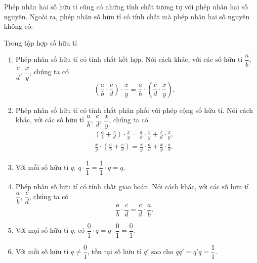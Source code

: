 Phép nhân hai số hữu tỉ cũng có những tính chất tương tự với phép nhân hai số nguyên. Ngoài ra, phép nhân số hữu tỉ có tính chất mà phép nhân hai số nguyên không có.
\begin{theorem}\label{theorem:property-of-rational-numbers-multiplication}
    Trong tập hợp số hữu tỉ
    \begin{enumerate}[label={(\roman*)}]
        \item Phép nhân số hữu tỉ có tính chất kết hợp. Nói cách khác, với các số hữu tỉ $\dfrac{a}{b}$, $\dfrac{c}{d}$, $\dfrac{x}{y}$, chúng ta có
              \[
                  \left(\frac{a}{b}\cdot\frac{c}{d}\right)\cdot\frac{x}{y} = \frac{a}{b}\cdot\left(\frac{c}{d}\cdot\frac{x}{y}\right).
              \]
        \item Phép nhân số hữu tỉ có tính chất phân phối với phép cộng số hữu tỉ. Nói cách khác, với các số hữu tỉ $\dfrac{a}{b}$, $\dfrac{c}{d}$, $\dfrac{x}{y}$, chúng ta có
              \[
                  \begin{split}
                      \left(\frac{a}{b} + \frac{c}{d}\right)\cdot\frac{x}{y} = \frac{a}{b}\cdot\frac{x}{y} + \frac{c}{d}\cdot\frac{x}{y}, \\
                      \frac{x}{y}\cdot\left(\frac{a}{b} + \frac{c}{d}\right) = \frac{x}{y}\cdot\frac{a}{b} + \frac{x}{y}\cdot\frac{a}{b}.
                  \end{split}
              \]
        \item Với mỗi số hữu tỉ $q$, $q\cdot \dfrac{1}{1} = \dfrac{1}{1}\cdot q = q$.
        \item Phép nhân số hữu tỉ có tính chất giao hoán. Nói cách khác, với các số hữu tỉ $\dfrac{a}{b}$, $\dfrac{c}{d}$, chúng ta có
              \[
                  \frac{a}{b}\cdot\frac{c}{d} = \frac{c}{d}\cdot\frac{a}{b}.
              \]
        \item Với mọi số hữu tỉ $q$, có $\dfrac{0}{1}\cdot q = q\cdot\dfrac{0}{1} = \dfrac{0}{1}$.
        \item Với mỗi số hữu tỉ $q\ne \dfrac{0}{1}$, tồn tại số hữu tỉ $q'$ sao cho $qq' = q'q = \dfrac{1}{1}$.
    \end{enumerate}
\end{theorem}

